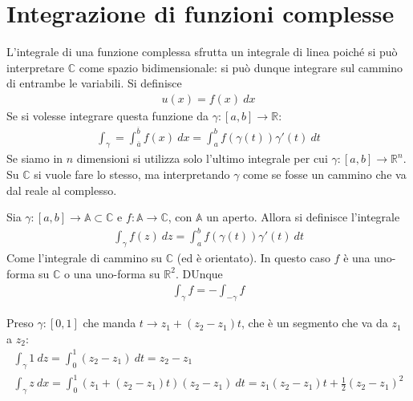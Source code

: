 \documentclass[a4paper, oneside]{article}
\begin{document}
\section{Integrazione di funzioni complesse}
L'integrale di una funzione complessa sfrutta un integrale di linea 
poiché si può interpretare $\mathbb{C}$ come spazio bidimensionale: 
si può dunque integrare sul cammino di entrambe le variabili. Si definisce
\begin{gather*}
    u(x) = f(x) \ dx 
\end{gather*}
Se si volesse integrare questa funzione da $\gamma : [a, b] \to \mathbb{R}$:
\begin{gather*}
    \int_{\gamma} = \int_{\overline{a} }^{\overline{b} }  f(x) \ dx = \int_{a}^{b} f(\gamma(t)) \gamma'(t) \ dt 
\end{gather*}
Se siamo in $n$ dimensioni si utilizza solo l'ultimo integrale per cui 
$\gamma : [a, b] \to \mathbb{R}^{n}$. Su $\mathbb{C}$ si vuole fare lo stesso, 
ma interpretando $\gamma$ come se fosse un cammino che va dal reale al complesso.

\begin{definition}
    Sia $\gamma : [a, b] \to \mathbb{A} \subset \mathbb{C}$ e $f : \mathbb{A} \to \mathbb{C}$, con $\mathbb{A}$
    un aperto. Allora si definisce l'integrale
    \begin{align}
        \int_{\gamma} f(z) \ dz = \int_{a}^{b} f(\gamma(t))\gamma'(t) \ dt
    \end{align}
    Come l'integrale di cammino su $\mathbb{C}$ (ed è orientato).
    In questo caso $f$ è una uno-forma su $\mathbb{C}$ o una uno-forma su $\mathbb{R}^{2}$.
    DUnque 
    \begin{gather*}
        \int_{\gamma}f = -\int_{-\gamma } f
    \end{gather*}
\end{definition}

\begin{example}
    Preso $\gamma: [0, 1]$ che manda $t \to z_1 + (z_2 - z_1)t $, che è 
    un segmento che va da $z_1$ a $z_2$:
    \begin{gather*}
        \int_{\gamma} 1 \ dz = \int_{0}^{1} (z_2 - z_1) \ dt = z_2 - z_1 \\
        \int_{\gamma} z \ dx = \int_{0}^{1} (z_1 +(z_2 - z_1) t) (z_2 - z_1) \ dt = z_1(z_2 - z_1)t + \frac{1}{2}(z_2 - z_1)^{2}    
    \end{gather*}
\end{example}
\end{document}
